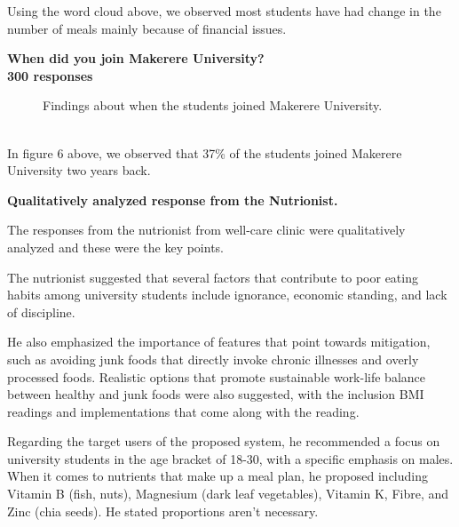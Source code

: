 \documentclass{article}
\begin{document}
Using the word cloud above, we observed most students have had change in the number of meals mainly because of financial issues.

\noindent
\textbf{When did you join Makerere University?\\300 responses}
\begin{figure}[h]
    \centering
\caption{Findings about when the students joined Makerere University.}
\end{figure}
\\
In figure 6 above, we observed that 37\% of the students joined Makerere University two years back.

\newpage
\noindent
\textbf{Qualitatively analyzed response from the Nutrionist.} 

\noindent The responses from the nutrionist from well-care clinic were qualitatively analyzed and these were the key points.

\noindent The nutrionist suggested that several factors that contribute to poor eating habits among university students include ignorance, economic standing, and lack of discipline. 

\vspace{10pt}

\noindent He also emphasized the importance of features that point towards mitigation, such as avoiding junk foods that directly invoke chronic illnesses and overly processed foods. Realistic options that promote sustainable work-life balance between healthy and junk foods were also suggested, with the inclusion  BMI readings and implementations that come along with the reading.

\vspace{10pt}

\noindent Regarding the target users of the proposed system, he recommended a focus on university students in the age bracket of 18-30, with a specific emphasis on males. When it comes to nutrients that make up a meal plan, he proposed including Vitamin B (fish, nuts), Magnesium (dark leaf vegetables), Vitamin K, Fibre, and Zinc (chia seeds). He stated proportions aren't necessary.

\vspace{10pt}
\end{document}
